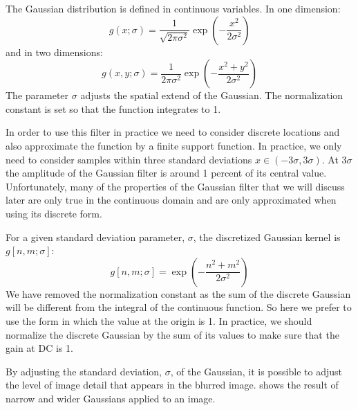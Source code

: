 The Gaussian distribution is defined in continuous variables. In one dimension:
\begin{equation}
g(x; \sigma) = \frac{1}{\sqrt{2 \pi \sigma^2}} \exp{ \left( -\frac{x^2}{2 \sigma^2} \right) }
\label{eq:gauss1dcont}
\end{equation}
and in two dimensions:
\begin{equation}
g(x,y; \sigma) = \frac{1}{2 \pi \sigma^2} \exp{ \left(-\frac{x^2 +
   y^2}{2 \sigma^2} \right) }
\label{eq:gauss2dcont}
\end{equation}
The parameter $\sigma$ adjusts the spatial extend of the Gaussian. The normalization constant is set so that the function integrates to 1.

In order to use this filter in practice we need to consider discrete locations and also approximate the function by a finite support function. In practice, we only need to consider samples within three standard deviations $x \in (-3\sigma, 3\sigma)$. At $3\sigma$ the amplitude of the Gaussian filter is around 1 percent of its central value. Unfortunately, many of the properties of the Gaussian filter that we will discuss later are only true in the continuous domain and are only approximated when using its discrete form. 

For a given standard deviation parameter, $\sigma$, the discretized Gaussian kernel is $g \left[n, m; \sigma \right]$:
\begin{equation}
g \left[ n,m; \sigma \right] = \exp{ \left( -\frac{n^2 + m^2}{2 \sigma^2} \right) }
\label{eq:gauss2d}
\end{equation}
We have removed the normalization constant as the sum of the discrete Gaussian will be different from the integral of the continuous function. So here we prefer to use the form in which the value at the origin is 1. In practice, we should normalize the discrete Gaussian by the sum of its values to make sure that the gain at DC is 1. 

By adjusting the standard deviation, $\sigma$, of the Gaussian, it is possible to adjust the level of image detail
that appears in the blurred image. \Fig{\ref{fig:zebragaussian}} shows the result of narrow and wider Gaussians applied to an image. 
 

